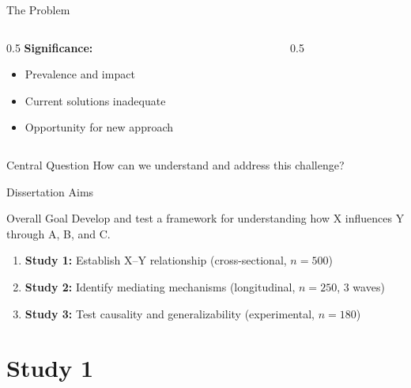 \documentclass[aspectratio=169,12pt]{beamer}
\begin{document}
\begin{frame}{The Problem}
  \begin{columns}[T]
    \begin{column}{0.5\textwidth}
      \textbf{Significance:}
      \begin{itemize}
        \item Prevalence and impact
        \item Current solutions inadequate
        \item Opportunity for new approach
      \end{itemize}
    \end{column}
    \begin{column}{0.5\textwidth}
    \end{column}
  \end{columns}
  \vspace{0.5cm}
  \begin{alertblock}{Central Question}
    How can we understand and address this challenge?
  \end{alertblock}
\end{frame}

\begin{frame}{Dissertation Aims}
  \begin{block}{Overall Goal}
    Develop and test a framework for understanding how X influences Y through A, B, and C.
  \end{block}
  \vspace{0.3cm}
  \begin{enumerate}
    \item \textbf{Study 1:} Establish X–Y relationship (cross-sectional, $n=500$)
    \item \textbf{Study 2:} Identify mediating mechanisms (longitudinal, $n=250$, 3 waves)
    \item \textbf{Study 3:} Test causality and generalizability (experimental, $n=180$)
  \end{enumerate}
\end{frame}

\section{Study 1}
\end{document}
